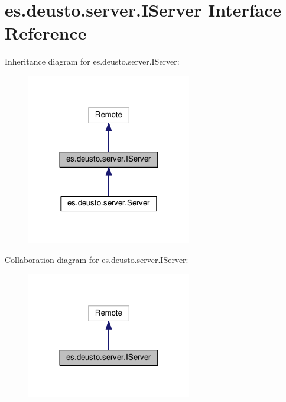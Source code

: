 \hypertarget{interfacees_1_1deusto_1_1server_1_1_i_server}{}\section{es.\+deusto.\+server.\+I\+Server Interface Reference}
\label{interfacees_1_1deusto_1_1server_1_1_i_server}


Inheritance diagram for es.\+deusto.\+server.\+I\+Server\+:\nopagebreak
\begin{figure}[H]
\begin{center}
\leavevmode
\includegraphics[width=204pt]{interfacees_1_1deusto_1_1server_1_1_i_server__inherit__graph}
\end{center}
\end{figure}


Collaboration diagram for es.\+deusto.\+server.\+I\+Server\+:\nopagebreak
\begin{figure}[H]
\begin{center}
\leavevmode
\includegraphics[width=204pt]{interfacees_1_1deusto_1_1server_1_1_i_server__coll__graph}
\end{center}
\end{figure}
